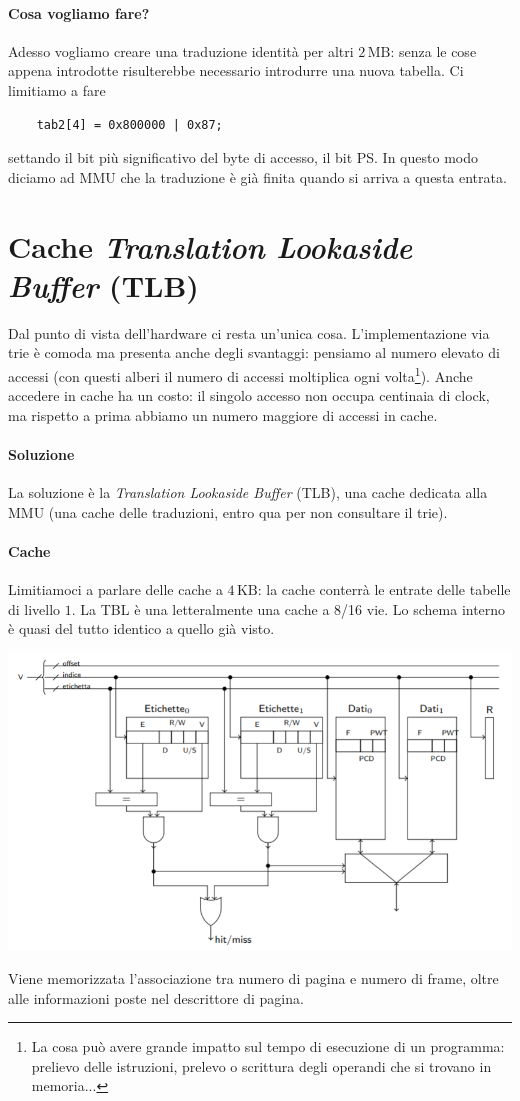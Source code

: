 \paragraph{Cosa vogliamo fare?} Adesso vogliamo creare una traduzione identità per altri $2\,\text{MB}$: senza le cose appena introdotte risulterebbe necessario introdurre una nuova tabella. Ci limitiamo a fare
\begin{verbatim}
	tab2[4] = 0x800000 | 0x87;
\end{verbatim}
settando il bit più significativo del byte di accesso, il bit PS. In questo modo diciamo ad MMU che la traduzione è già finita quando si arriva a questa entrata.


\section{Cache \emph{Translation Lookaside Buffer} (TLB)}
Dal punto di vista dell'hardware ci resta un'unica cosa. L'implementazione via trie è comoda ma presenta anche degli svantaggi: pensiamo al numero elevato di accessi (con questi alberi il numero di accessi moltiplica ogni volta\footnote{La cosa può avere grande impatto sul tempo di esecuzione di un programma: prelievo delle istruzioni, prelevo o scrittura degli operandi che si trovano in memoria...}). Anche accedere in cache ha un costo: il singolo accesso non occupa centinaia di clock, ma rispetto a prima abbiamo un numero maggiore di accessi in cache. 
\paragraph{Soluzione} La soluzione è la \emph{Translation Lookaside Buffer} (TLB), una cache dedicata alla MMU (una cache delle traduzioni, entro qua per non consultare il trie). 
\paragraph{Cache} Limitiamoci a parlare delle cache a $4\,\text{KB}$: la cache conterrà le entrate delle tabelle di livello $1$. La TBL è una letteralmente una cache a 8/16 vie. Lo schema interno è quasi del tutto identico a quello già visto.
\begin{center}
	\includegraphics[scale=.8]{img/228.PNG}
\end{center}
Viene memorizzata l'associazione tra numero di pagina e numero di frame, oltre alle informazioni poste nel descrittore di pagina.

